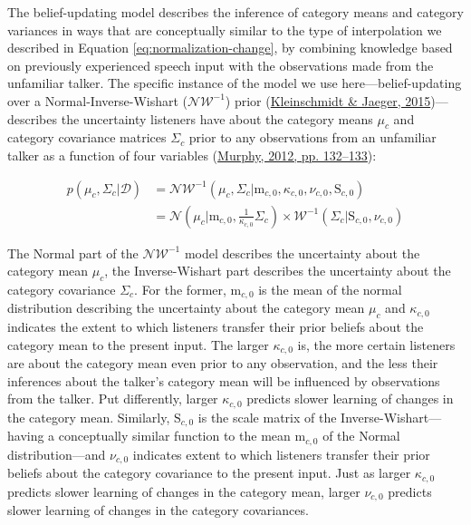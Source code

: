 \documentclass[
  11pt,
  english,
  man,floatsintext]{apa6}
\begin{document}
The belief-updating model describes the inference of category means and category variances in ways that are conceptually similar to the type of interpolation we described in Equation \eqref{eq:normalization-change}, by combining knowledge based on previously experienced speech input with the observations made from the unfamiliar talker. The specific instance of the model we use here---belief-updating over a Normal-Inverse-Wishart (\(\mathcal{NW^{-1}}\)) prior (\protect\hyperlink{ref-kleinschmidt-jaeger2015}{Kleinschmidt \& Jaeger, 2015})---describes the uncertainty listeners have about the category means \(\mu_c\) and category covariance matrices \(\Sigma_c\) prior to any observations from an unfamiliar talker as a function of four variables (\protect\hyperlink{ref-murphy2012}{Murphy, 2012, pp. 132--133}):

\begin{equation}\label{eq:niw-updating}
\begin{split}
p\left( \mu_c, \Sigma_c | \mathcal{D} \right) & = \mathcal{NW}^{-1} \left( \mu_c, \Sigma_c | \mathrm{m}_{c,0}, \kappa_{c,0}, \nu_{c,0}, \mathrm{S}_{c,0} \right) \\
& = \mathcal{N}\left( \mu_c | \mathrm{m}_{c,0}, \frac{1}{\kappa_{c,0}} \Sigma_{c} \right) \times \mathcal{W}^{-1}\left( \Sigma_c | \mathrm{S}_{c,0}, \nu_{c,0} \right)
\end{split}
\end{equation}

The Normal part of the \(\mathcal{NW^{-1}}\) model describes the uncertainty about the category mean \(\mu_c\), the Inverse-Wishart part describes the uncertainty about the category covariance \(\Sigma_c\). For the former, \(\mathrm{m}_{c,0}\) is the mean of the normal distribution describing the uncertainty about the category mean \(\mu_c\) and \(\kappa_{c,0}\) indicates the extent to which listeners transfer their prior beliefs about the category mean to the present input. The larger \(\kappa_{c,0}\) is, the more certain listeners are about the category mean even prior to any observation, and the less their inferences about the talker's category mean will be influenced by observations from the talker. Put differently, larger \(\kappa_{c,0}\) predicts slower learning of changes in the category mean. Similarly, \(\mathrm{S}_{c,0}\) is the scale matrix of the Inverse-Wishart---having a conceptually similar function to the mean \(\mathrm{m}_{c,0}\) of the Normal distribution---and \(\nu_{c,0}\) indicates extent to which listeners transfer their prior beliefs about the category covariance to the present input. Just as larger \(\kappa_{c,0}\) predicts slower learning of changes in the category mean, larger \(\nu_{c,0}\) predicts slower learning of changes in the category covariances.
\end{document}
